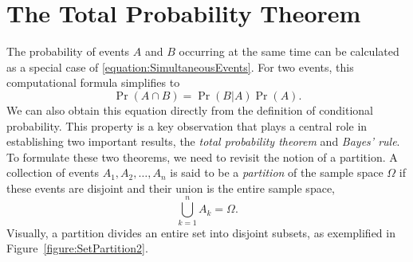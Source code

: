 \section{The Total Probability Theorem}

The probability of events $A$ and $B$ occurring at the same time can be calculated as a special case of \eqref{equation:SimultaneousEvents}.
For two events, this computational formula simplifies to
\begin{equation} \label{equation:ProbabilityIntersection}
\Pr (A \cap B) = \Pr (B|A) \Pr (A) .
\end{equation}
We can also obtain this equation directly from the definition of conditional probability.
This property is a key observation that plays a central role in establishing two important results, the \emph{total probability theorem} and \emph{Bayes' rule}.
To formulate these two theorems, we need to revisit the notion of a partition.
A collection of events $A_1, A_2, \ldots, A_n$ is said to be a \emph{partition} of the sample space $\Omega$ if these events are disjoint and their union is the entire sample space, 
\begin{equation*}
\bigcup_{k=1}^n A_k = \Omega .
\end{equation*}
Visually, a partition divides an entire set into disjoint subsets, as exemplified in Figure~\ref{figure:SetPartition2}.

